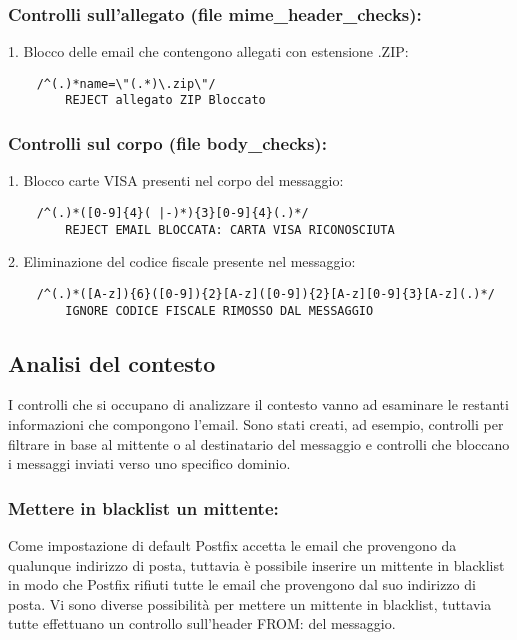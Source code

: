    \subsubsection{Controlli sull'allegato (file mime\_header\_checks):}

    1. Blocco delle email che contengono allegati con estensione .ZIP:

    \begin{verbatim}
    /^(.)*name=\"(.*)\.zip\"/
        REJECT allegato ZIP Bloccato
    \end{verbatim}

    \subsubsection{Controlli sul corpo (file body\_checks):}

    1. Blocco carte VISA presenti nel corpo del messaggio:
    \begin{verbatim}
    /^(.)*([0-9]{4}( |-)*){3}[0-9]{4}(.)*/
        REJECT EMAIL BLOCCATA: CARTA VISA RICONOSCIUTA
    \end{verbatim}
    2. Eliminazione del codice fiscale presente nel messaggio:
    \begin{verbatim}
    /^(.)*([A-z]){6}([0-9]){2}[A-z]([0-9]){2}[A-z][0-9]{3}[A-z](.)*/
        IGNORE CODICE FISCALE RIMOSSO DAL MESSAGGIO
    \end{verbatim}


    \subsection{Analisi del contesto}
    I controlli che si occupano di analizzare il contesto vanno ad esaminare le restanti 
    informazioni che compongono l’email. Sono stati creati, ad esempio, controlli per filtrare in base al 
    mittente o al destinatario del messaggio e controlli che bloccano i messaggi inviati verso uno specifico dominio.

    \subsubsection{Mettere in blacklist un mittente:}
    Come impostazione di default Postfix accetta le email che provengono da qualunque indirizzo di posta, 
    tuttavia è possibile inserire un mittente in blacklist in modo che Postfix rifiuti tutte le email che 
    provengono dal suo indirizzo di posta. Vi sono diverse possibilità per mettere un mittente in blacklist, 
    tuttavia tutte effettuano un controllo sull’header FROM: del messaggio.

